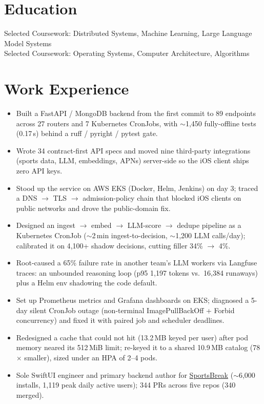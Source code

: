 \documentclass[11pt, letterpaper]{article}
\begin{document}

\section{Education}
Selected Coursework: Distributed Systems, Machine Learning, Large Language Model Systems\\[1pt]
Selected Coursework: Operating Systems, Computer Architecture, Algorithms

\section{Work Experience}
\begin{itemize}
  \item Built a FastAPI / MongoDB backend from the first commit to 89 endpoints across 27 routers and 7 Kubernetes CronJobs, with $\sim$1{,}450 fully-offline tests (0.17\,s) behind a ruff / pyright / pytest gate.
  \item Wrote 34 contract-first API specs and moved nine third-party integrations (sports data, LLM, embeddings, APNs) server-side so the iOS client ships zero API keys.
  \item Stood up the service on AWS EKS (Docker, Helm, Jenkins) on day 3; traced a DNS $\to$ TLS $\to$ admission-policy chain that blocked iOS clients on public networks and drove the public-domain fix.
  \item Designed an ingest $\to$ embed $\to$ LLM-score $\to$ dedupe pipeline as a Kubernetes CronJob ($\sim$2\,min ingest-to-decision, $\sim$1{,}200 LLM calls/day); calibrated it on 4{,}100+ shadow decisions, cutting filler 34\% $\to$ 4\%.
  \item Root-caused a 65\% failure rate in another team's LLM workers via Langfuse traces: an unbounded reasoning loop (p95 1{,}197 tokens vs.\ 16{,}384 runaways) plus a Helm env shadowing the code default.
  \item Set up Prometheus metrics and Grafana dashboards on EKS; diagnosed a 5-day silent CronJob outage (non-terminal ImagePullBackOff + Forbid concurrency) and fixed it with paired job and scheduler deadlines.
  \item Redesigned a cache that could not hit (13.2\,MB keyed per user) after pod memory neared its 512\,MiB limit; re-keyed it to a shared 10.9\,MB catalog (78$\times$ smaller), sized under an HPA of 2--4 pods.
  \item Sole SwiftUI engineer and primary backend author for \href{https://apps.apple.com/app/id6762649287}{SportsBreak} ($\sim$6{,}000 installs, 1{,}119 peak daily active users); 344 PRs across five repos (340 merged).
\end{itemize}
\end{document}
